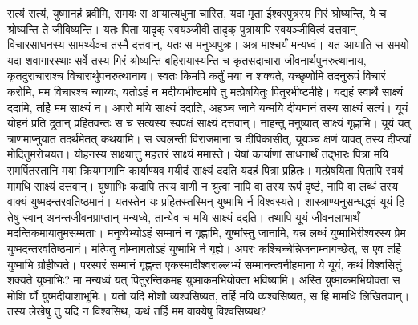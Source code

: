 \vakya सत्यं सत्यं, युष्मानहं ब्रवीमि, समयः स आयात्यधुना चास्ति, यदा मृता ईश्वरपुत्रस्य गिरं श्रोष्यन्ति, ये च श्रोष्यन्ति ते जीविष्यन्ति।
\vakya यतः पिता यादृक् स्वयञ्जीवी तादृक् पुत्रायापि स्वयञ्जीवित्वं दत्तवान् विचारसाधनस्य सामर्थ्यञ्च तस्मै दत्तवान्, यतः स मनुष्यपुत्रः।
\vakya अत्र माश्चर्यं मन्यध्वं।
\vakya यत आयाति स समयो यदा शवागारस्थाः सर्वे तस्य गिरं श्रोष्यन्ति
\vakya बहिरायास्यन्ति च कृतसदाचारा जीवनार्थपुनरुत्थानाय, कृतदुराचाराश्च विचारार्थुपनरुत्थानाय।
\vakya स्वतः किमपि कर्तुं मया न शक्यते, यच्छृणोमि तदनुरूपं विचारं करोमि, मम विचारश्च न्याय्यः, यतोऽहं न मदीयाभीष्टमपि तु मत्प्रेषयितुः पितुरभीष्टमीहे।
\vakya यद्यहं स्वार्थे साक्ष्यं ददामि, तर्हि मम साक्ष्यं न।
\vakya अपरो मयि साक्ष्यं ददाति, अहञ्च जाने यन्मयि दीयमानं तस्य साक्ष्यं सत्यं।
\vakya यूयं योहनं प्रति दूतान् प्रहितवन्तः स च सत्यस्य स्वपक्षं साक्ष्यं दत्तवान्।
\vakya नाहन्तु मनुष्यात् साक्ष्यं गृह्णामि। यूयं यत् त्राणमाप्नुयात तदर्थमेतत् कथयामि।
\vakya स ज्वलन्ती विराजमाना च दीपिकासीत्, यूयञ्च क्षणं यावत् तस्य दीप्त्यां मोदितुमरोचयत।
\vakya योहनस्य साक्ष्यात्तु महत्तरं साक्ष्यं ममास्ते। येषां कार्याणां साधनार्थं तद्भारः पित्रा मयि समर्पितस्तानि मया क्रियमाणानि कार्याण्यव मयीदं साक्ष्यं ददति यदहं पित्रा प्रहितः।
\vakya मत्प्रेषयिता पितापि स्वयं मामधि साक्ष्यं दत्तवान्। युष्माभिः कदापि तस्य वाणी न श्रुत्वा नापि वा तस्य रूपं दृष्टं, नापि वा लब्धं तस्य वाक्यं युष्मदन्तरवतिष्ठमानं।
\vakya यतस्तेन यः प्रहितस्तस्मिन् युष्माभि र्न विश्वस्यते।
\vakya शास्त्राण्यनुसन्धद्ध्वं यूयं हि तेषु स्वान् अनन्तजीवनप्राप्तान् मन्यध्वे, तान्येव च मयि साक्ष्यं ददति।
\vakya तथापि यूयं जीवनलाभार्थं मदन्तिकमायातुमसम्मताः।
\vakya मनुष्येभ्योऽहं सम्मानं न गृह्णामि,
\vakya युष्मांस्तु जानामि, यन्न लब्धं युष्माभिरीश्वरस्य प्रेम युष्मदन्तरवतिष्ठमानं।
\vakya मत्पितु र्नाम्नागतोऽहं युष्माभि र्न गृह्ये। अपरः कश्चिच्चेन्निजनाम्नागच्छेत्, स एव तर्हि युष्माभि र्ग्राहीष्यते।
\vakya परस्परं सम्मानं गृह्णन्त एकस्मादीश्वराल्लभ्यं सम्मानन्त्वनीहमाना ये यूयं, कथं विश्वसितुं शक्यते युष्माभिः?
\vakya मा मन्यध्वं यत् पितुरन्तिकमहं युष्माकमभियोक्ता भविष्यामि। अस्ति युष्माकमभियोक्ता स मोशि र्यो युष्मदीयाशाभूमिः।
\vakya यतो यदि मोशौ व्यश्वसिष्यत, तर्हि मयि व्यश्वसिष्यत, स हि मामधि लिखितवान्।
\vakya तस्य लेखेषु तु यदि न विश्वसिथ, कथं तर्हि मम वाक्येषु विश्वसिष्यथ?\eoc